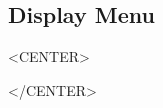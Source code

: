 %
%
%


\subsection{Display Menu}
\label{ug:ui:window:display}

\begin{rawhtml}
<CENTER>
\end{rawhtml}
\begin{rawhtml}
</CENTER>
\end{rawhtml}

